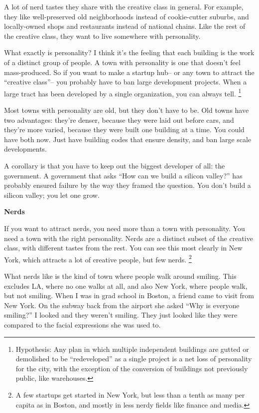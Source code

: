 \documentclass[12pt]{book}
\begin{document}
A lot of nerd tastes they share with the creative class in general. For
example, they like well-preserved old neighborhoods instead of
cookie-cutter suburbs, and locally-owned shops and restaurants instead
of national chains. Like the rest of the creative class, they want to
live somewhere with personality.

What exactly is personality? I think it's the feeling that each building
is the work of a distinct group of people. A town with personality is
one that doesn't feel mass-produced. So if you want to make a startup
hub-- or any town to attract the ``creative class''-- you probably have
to ban large development projects. When a large tract has been developed
by a single organization, you can always tell. \footnote{Hypothesis: Any plan in which multiple independent buildings are
gutted or demolished to be ``redeveloped'' as a single project is a net
loss of personality for the city, with the exception of the conversion
of buildings not previously public, like warehouses.}

Most towns with personality are old, but they don't have to be. Old
towns have two advantages: they're denser, because they were laid out
before cars, and they're more varied, because they were built one
building at a time. You could have both now. Just have building codes
that ensure density, and ban large scale developments.

A corollary is that you have to keep out the biggest developer of all:
the government. A government that asks ``How can we build a silicon
valley?'' has probably ensured failure by the way they framed the
question. You don't build a silicon valley; you let one grow.

\textbf{Nerds}

If you want to attract nerds, you need more than a town with
personality. You need a town with the right personality. Nerds are a
distinct subset of the creative class, with different tastes from the
rest. You can see this most clearly in New York, which attracts a lot of
creative people, but few nerds. \footnote{A few startups get started in New York, but less than a tenth as
many per capita as in Boston, and mostly in less nerdy fields like
finance and media.}

What nerds like is the kind of town where people walk around smiling.
This excludes LA, where no one walks at all, and also New York, where
people walk, but not smiling. When I was in grad school in Boston, a
friend came to visit from New York. On the subway back from the airport
she asked ``Why is everyone smiling?'' I looked and they weren't
smiling. They just looked like they were compared to the facial
expressions she was used to.
\end{document}
